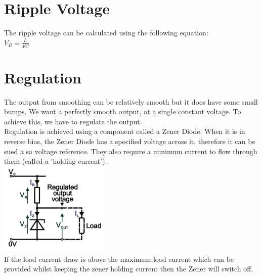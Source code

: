 \documentclass[a4paper, 11pt, twocolumn]{article}
\begin{document}
\section{Ripple Voltage}
The ripple voltage can be calculated using the following equation:\\
$\displaystyle V_R = \frac{I_c}{F C}$\\

\section{Regulation}
The output from smoothing can be relatively smooth but it does have some small bumps. We want a perfectly smooth output, at a single constant voltage. To achieve this, we have to regulate the output.\\
Regulation is achieved using a component called a Zener Diode. When it is in reverse bias, the Zener Diode has a specified voltage across it, therefore it can be sued a sa voltage reference. They also require a minimum current to flow through them (called a 'holding current'). \\
\includegraphics[width=0.4\textwidth]{regulation.jpg}\\
If the load current draw is above the maximum load current which can be provided whilst keeping the zener holding current then the Zener will switch off. 
\end{document}
